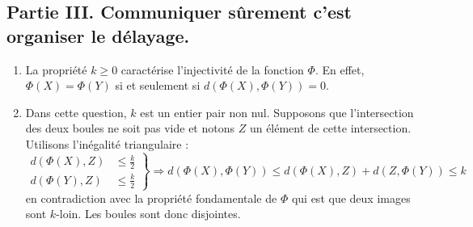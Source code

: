 \subsection*{Partie III. Communiquer sûrement c'est organiser le délayage.}
\begin{enumerate}
 \item La propriété $k\geq 0$ caractérise l'injectivité de la fonction $\Phi$. En effet, $\Phi(X)=\Phi(Y)$ si et seulement si $d(\Phi(X),\Phi(Y))=0$.
 
 \item Dans cette question, $k$ est un entier pair non nul. Supposons que l'intersection des deux boules ne soit pas vide et notons $Z$ un élément de cette intersection. Utilisons l'inégalité triangulaire :
\begin{displaymath}
 \left. 
\begin{aligned}
 d(\Phi(X),Z)&\leq\frac{k}{2}\\
d(\Phi(Y),Z)&\leq\frac{k}{2}
\end{aligned}
\right\rbrace 
\Rightarrow
d(\Phi(X),\Phi(Y))\leq d(\Phi(X),Z)+d(Z,\Phi(Y)) \leq k
\end{displaymath}
en contradiction avec la propriété fondamentale de $\Phi$ qui est que deux images sont \og $k$-loin\fg. Les boules sont donc disjointes.


\end{enumerate}
